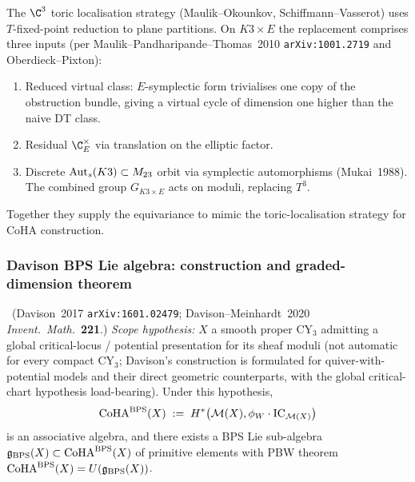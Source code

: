 \begin{remark}
\label{w17:rem:toric-replaced-by-reduced}
The $\C^3$ toric localisation strategy (Maulik--Okounkov, Schiffmann--Vasserot)
uses $T$-fixed-point reduction to plane partitions. On $K3 \times E$ the
replacement comprises three inputs (per Maulik--Pandharipande--Thomas~2010
\texttt{arXiv:1001.2719} and Oberdieck--Pixton):
\begin{enumerate}
\item Reduced virtual class: $E$-symplectic form trivialises one copy of the
obstruction bundle, giving a virtual cycle of dimension one higher than the
naive DT class.
\item Residual $\C^\times_E$ via translation on the elliptic factor.
\item Discrete $\mathrm{Aut}_s(K3) \subset M_{23}$ orbit via symplectic automorphisms
(Mukai~1988). The combined group $G_{K3 \times E}$ acts on moduli, replacing
$T^3$.
\end{enumerate}
Together they supply the equivariance to mimic the toric-localisation strategy
for CoHA construction.
\end{remark}

\subsubsection{Davison BPS Lie algebra: construction and graded-dimension theorem}
\label{w17:subsubsec:k3e-davison}

\begin{definition}
\label{w17:def:davison-bps}
\ClaimStatusConjectured\ (Davison~2017 \texttt{arXiv:1601.02479};
Davison--Meinhardt~2020 \emph{Invent.\ Math.}~\textbf{221}.)
\emph{Scope hypothesis:} $X$ a smooth proper CY$_3$ admitting a global
critical-locus / potential presentation for its sheaf moduli (not automatic
for every compact CY$_3$; Davison's construction is formulated for
quiver-with-potential models and their direct geometric counterparts, with the
global critical-chart hypothesis load-bearing).
Under this hypothesis,
\[
 \mathrm{CoHA}^{\mathrm{BPS}}(X) \;:=\;
 H^*\bigl(\mathcal{M}(X), \phi_W \cdot \mathrm{IC}_{\mathcal{M}(X)}\bigr)
\]
is an associative algebra, and there exists a BPS Lie sub-algebra
$\mathfrak{g}_{\mathrm{BPS}}(X) \subset \mathrm{CoHA}^{\mathrm{BPS}}(X)$ of primitive elements with PBW
theorem $\mathrm{CoHA}^{\mathrm{BPS}}(X) = U(\mathfrak{g}_{\mathrm{BPS}}(X))$.
\end{definition}

